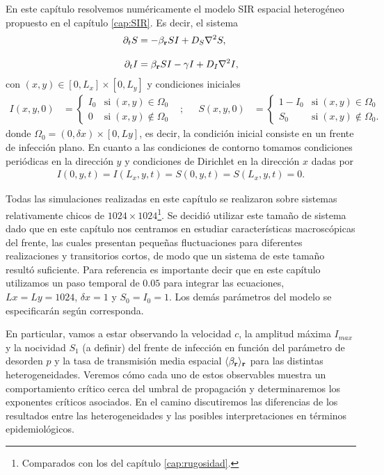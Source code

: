 \graphicspath{{figs/cap5}}
\vspace*{-.3cm}
En este capítulo resolvemos numéricamente el modelo SIR espacial heterogéneo propuesto en el capítulo \ref{cap:SIR}. Es decir, el sistema
\begin{align}
    \partial_t S &=-\beta_{\vb r} SI + D_{S} \laplacian{S},\label{Seqdif}\\[.3cm]
    \partial_t I &=\beta_{\vb r} SI - \gamma I + D_{I} \laplacian{I},\label{Ieqdif}
\end{align}
con $(x,y) \in [0,L_x]\times[0,L_y]$ y condiciones iniciales
\begin{align*}
    I(x,y,0) &= 
    \begin{cases}
    I_0 & \text{si} \; (x,y) \in \Omega_0 \\
    0 & \text{si} \; (x,y) \notin \Omega_0  
    \end{cases}
    & ;&&
    S(x,y,0) &=
    \begin{cases}
    1-I_0 & \text{si} \; (x,y) \in \Omega_0 \\
    S_0 & \text{si} \; (x,y) \notin \Omega_0.
    \end{cases}
\end{align*}
donde $\Omega_0 = (0,\delta x) \times [0,Ly]$, es decir, la condición inicial consiste en un frente de infección plano. En cuanto a las condiciones de contorno tomamos condiciones periódicas en la dirección $y$ y condiciones de Dirichlet en la dirección $x$ dadas por
\begin{align*}
    I(0,y,t)=I(L_x,y,t)=S(0,y,t)=S(L_x,y,t)=0.
\end{align*}

Todas las simulaciones realizadas en este capítulo se realizaron sobre sistemas relativamente chicos de $1024\times 1024$\footnote{Comparados con los del capítulo \ref{cap:rugosidad}.}. Se decidió utilizar este tamaño de sistema dado que en este capítulo nos centramos en estudiar características macroscópicas del frente, las cuales presentan pequeñas fluctuaciones para diferentes realizaciones y transitorios cortos, de modo que un sistema de este tamaño resultó suficiente. Para referencia es importante decir que en este capítulo utilizamos un paso temporal de $0.05$ para integrar las ecuaciones, $Lx=Ly=1024$, $\delta x=1$ y $S_0=I_0=1$. Los demás parámetros del modelo se especificarán según corresponda.

En particular, vamos a estar observando la velocidad $c$, la amplitud máxima $I_{max}$ y la nocividad $S_1$ (a definir) del frente de infección en función del parámetro de desorden $p$ y la tasa de transmisión media espacial $\langle\beta_{\vb r}\rangle_{\vb r}$ para las distintas heterogeneidades. Veremos cómo cada uno de estos observables muestra un comportamiento crítico cerca del umbral de propagación y determinaremos los exponentes críticos asociados. En el camino discutiremos las diferencias de los resultados entre las heterogeneidades y las posibles interpretaciones en términos epidemiológicos. 

